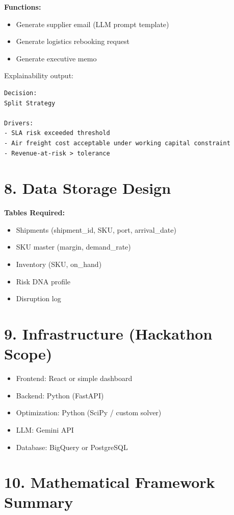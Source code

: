 \documentclass[11pt]{article}
\begin{document}
\textbf{Functions:}

\begin{itemize}
    \item Generate supplier email (LLM prompt template)
    \item Generate logistics rebooking request
    \item Generate executive memo
\end{itemize}

Explainability output:

\begin{verbatim}
Decision:
Split Strategy

Drivers:
- SLA risk exceeded threshold
- Air freight cost acceptable under working capital constraint
- Revenue-at-risk > tolerance
\end{verbatim}

\section*{8. Data Storage Design}

\textbf{Tables Required:}

\begin{itemize}
    \item Shipments (shipment\_id, SKU, port, arrival\_date)
    \item SKU master (margin, demand\_rate)
    \item Inventory (SKU, on\_hand)
    \item Risk DNA profile
    \item Disruption log
\end{itemize}

\section*{9. Infrastructure (Hackathon Scope)}

\begin{itemize}
    \item Frontend: React or simple dashboard
    \item Backend: Python (FastAPI)
    \item Optimization: Python (SciPy / custom solver)
    \item LLM: Gemini API
    \item Database: BigQuery or PostgreSQL
\end{itemize}

\section*{10. Mathematical Framework Summary}
\end{document}
